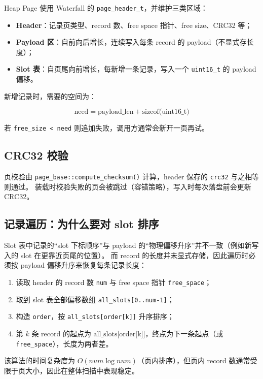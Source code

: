 Heap Page 使用 Waterfall 的 \texttt{page\_header\_t}，并维护三类区域：

\begin{itemize}
  \item \textbf{Header}：记录页类型、record 数、free space 指针、free size、CRC32 等；
  \item \textbf{Payload 区}：自前向后增长，连续写入每条 record 的 payload（不显式存长度）；
  \item \textbf{Slot 表}：自页尾向前增长，每新增一条记录，写入一个 \texttt{uint16\_t} 的 payload 偏移。
\end{itemize}

新增记录时，需要的空间为：

\[
\text{need} = \text{payload\_len} + \text{sizeof(uint16\_t)}
\]

若 \texttt{free\_size < need} 则追加失败，调用方通常会新开一页再试。

\subsection{CRC32 校验}

页校验由 \texttt{page\_base::compute\_checksum()} 计算，header 保存的 \texttt{crc32} 与之相等则通过。
装载时校验失败的页会被跳过（容错策略），写入时每次落盘前会更新 CRC32。

\subsection{记录遍历：为什么要对 slot 排序}

Slot 表中记录的“slot 下标顺序”与 payload 的“物理偏移升序”并不一致（例如新写入的 slot 在更靠近页尾的位置）。
而 record 的长度并未显式存储，因此遍历时必须按 payload 偏移升序来恢复每条记录长度：

\begin{enumerate}
  \item 读取 header 的 record 数 \texttt{num} 与 free space 指针 \texttt{free\_space}；
  \item 取到 slot 表全部偏移数组 \texttt{all\_slots[0..num-1]}；
  \item 构造 \texttt{order}，按 \texttt{all\_slots[order[k]]} 升序排序；
  \item 第 \(k\) 条 record 的起点为 \(\text{all\_slots[order[k]]}\)，终点为下一条起点（或 \texttt{free\_space}），长度为两者差。
\end{enumerate}

该算法的时间复杂度为 \(O(num \log num)\)（页内排序），但页内 record 数通常受限于页大小，因此在整体扫描中表现稳定。

